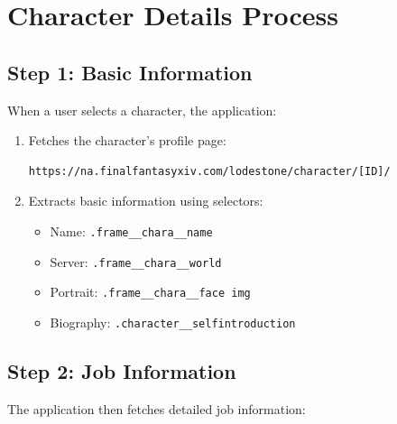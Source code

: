 \documentclass{article}
\begin{document}
\section{Character Details Process}

\subsection{Step 1: Basic Information}
When a user selects a character, the application:

\begin{enumerate}[label=\alph*)]
    \item Fetches the character's profile page:
    \begin{lstlisting}[language=text]
https://na.finalfantasyxiv.com/lodestone/character/[ID]/
    \end{lstlisting}
    \item Extracts basic information using selectors:
    \begin{itemize}
        \item Name: \texttt{.frame\_\_chara\_\_name}
        \item Server: \texttt{.frame\_\_chara\_\_world}
        \item Portrait: \texttt{.frame\_\_chara\_\_face img}
        \item Biography: \texttt{.character\_\_selfintroduction}
    \end{itemize}
\end{enumerate}

\subsection{Step 2: Job Information}
The application then fetches detailed job information:
\end{document}
